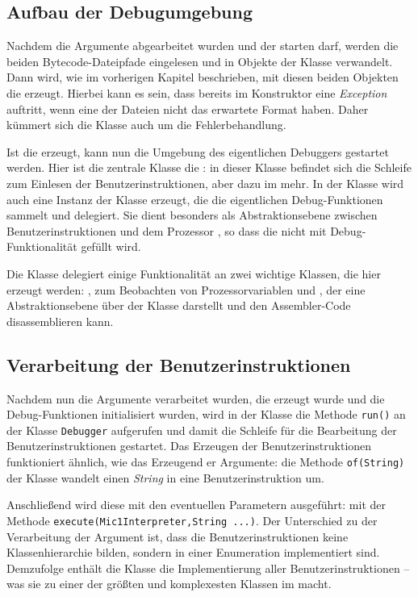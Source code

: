 \subsection{Aufbau der Debugumgebung}
Nachdem die Argumente abgearbeitet wurden und der \md starten darf, werden die beiden Bytecode-Dateipfade eingelesen und in Objekte der Klasse  verwandelt. Dann wird, wie im vorherigen Kapitel beschrieben, mit diesen beiden Objekten die \mic erzeugt. Hierbei kann es sein, dass bereits im Konstruktor eine \emph{Exception} auftritt, wenn eine der Dateien nicht das erwartete Format haben. Daher kümmert sich die Klasse  auch um die Fehlerbehandlung.

Ist die \mic erzeugt, kann nun die Umgebung des eigentlichen Debuggers gestartet werden. Hier ist die zentrale Klasse die : in dieser Klasse befindet sich die Schleife zum Einlesen der Benutzerinstruktionen, aber dazu im  mehr. In der Klasse  wird auch eine Instanz der Klasse  erzeugt, die die eigentlichen Debug-Funktionen sammelt und delegiert. Sie dient besonders als Abstraktionsebene zwischen Benutzerinstruktionen und dem Prozessor \mic, so dass die \mic nicht mit Debug-Funktionalität gefüllt wird.

Die Klasse  delegiert einige Funktionalität an zwei wichtige Klassen, die hier erzeugt werden: , zum Beobachten von Prozessorvariablen und , der eine Abstraktionsebene über der Klasse  darstellt und den Assembler-Code disassemblieren kann.


\subsection{Verarbeitung der Benutzerinstruktionen}
Nachdem nun die Argumente verarbeitet wurden, die \mic erzeugt wurde und die Debug-Funktionen initialisiert wurden, wird in der Klasse  die Methode \texttt{run()} an der Klasse \texttt{Debugger} aufgerufen und damit die Schleife für die Bearbeitung der Benutzerinstruktionen gestartet. Das Erzeugen der Benutzerinstruktionen funktioniert ähnlich, wie das Erzeugend er Argumente: die Methode \texttt{of(String)} der Klasse  wandelt einen \emph{String} in eine Benutzerinstruktion um.

Anschließend wird diese mit den eventuellen Parametern ausgeführt: mit der Methode \texttt{execute(Mic1Interpreter,String ...)}. Der Unterschied zu der Verarbeitung der Argument ist, dass die Benutzerinstruktionen keine Klassenhierarchie bilden, sondern in einer Enumeration implementiert sind. Demzufolge enthält die Klasse  die Implementierung aller Benutzerinstruktionen -- was sie zu einer der größten und komplexesten Klassen im \md macht.

